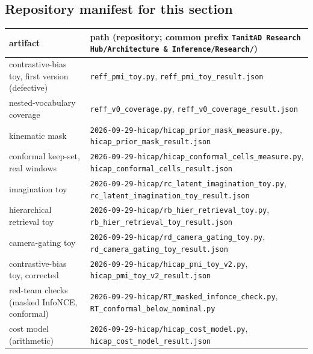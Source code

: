 \subsection{Repository manifest for this section}
\begin{tabular}{@{}p{4.2cm}p{11.6cm}@{}}
\toprule
artifact & path (repository; common prefix \texttt{TanitAD Research Hub/Architecture \& Inference/Research/}) \\ \midrule
contrastive-bias toy, first version (defective) & \texttt{reff\_pmi\_toy.py}, \texttt{reff\_pmi\_toy\_result.json} \\
nested-vocabulary coverage & \texttt{reff\_v0\_coverage.py}, \texttt{reff\_v0\_coverage\_result.json} \\
kinematic mask & \texttt{2026-09-29-hicap/hicap\_prior\_mask\_measure.py}, \texttt{hicap\_prior\_mask\_result.json} \\
conformal keep-set, real windows & \texttt{2026-09-29-hicap/hicap\_conformal\_cells\_measure.py}, \texttt{hicap\_conformal\_cells\_result.json} \\
imagination toy & \texttt{2026-09-29-hicap/rc\_latent\_imagination\_toy.py}, \texttt{rc\_latent\_imagination\_toy\_result.json} \\
hierarchical retrieval toy & \texttt{2026-09-29-hicap/rb\_hier\_retrieval\_toy.py}, \texttt{rb\_hier\_retrieval\_toy\_result.json} \\
camera-gating toy & \texttt{2026-09-29-hicap/rd\_camera\_gating\_toy.py}, \texttt{rd\_camera\_gating\_toy\_result.json} \\
contrastive-bias toy, corrected & \texttt{2026-09-29-hicap/hicap\_pmi\_toy\_v2.py}, \texttt{hicap\_pmi\_toy\_v2\_result.json} \\
red-team checks (masked InfoNCE, conformal) & \texttt{2026-09-29-hicap/RT\_masked\_infonce\_check.py}, \texttt{RT\_conformal\_below\_nominal.py} \\
cost model (arithmetic) & \texttt{2026-09-29-hicap/hicap\_cost\_model.py}, \texttt{hicap\_cost\_model\_result.json} \\
\bottomrule
\end{tabular}
